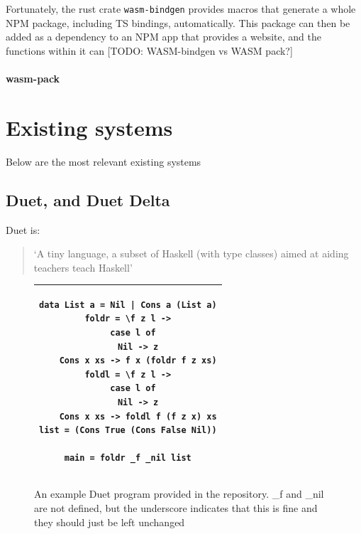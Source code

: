 Fortunately, the rust crate \verb|wasm-bindgen| provides macros that generate a whole NPM package, including TS bindings, automatically. This package can then be added as a dependency to an NPM app that provides a website, and the functions within it can [TODO: WASM-bindgen vs WASM pack?]

\paragraph{wasm-pack}
\label{bg:wasm-pack}

\section{Existing systems}
Below are the most relevant existing systems 

\subsection{Duet, and Duet Delta}
\label{bg:duet}
Duet is:

\begin{quotation}
`A tiny language, a subset of Haskell (with type classes) aimed at aiding teachers teach Haskell' \cite{duet_hackage}
\end{quotation}

\begin{figure}[h]
    \centering
    \begin{tabular}{c}
    \hline
    \begin{lstlisting}[language=SFL_noprelude_numbers]
data List a = Nil | Cons a (List a)
foldr = \f z l ->
  case l of
    Nil -> z
    Cons x xs -> f x (foldr f z xs)
foldl = \f z l ->
  case l of
    Nil -> z
    Cons x xs -> foldl f (f z x) xs
list = (Cons True (Cons False Nil))

main = foldr _f _nil list
\end{lstlisting}\\ \hline

    \end{tabular}
    \caption{An example Duet program provided in the repository. \_f and \_nil are not defined, but the underscore indicates that this is fine and they should just be left unchanged}
    \label{bg:duet_foldr}
\end{figure}


